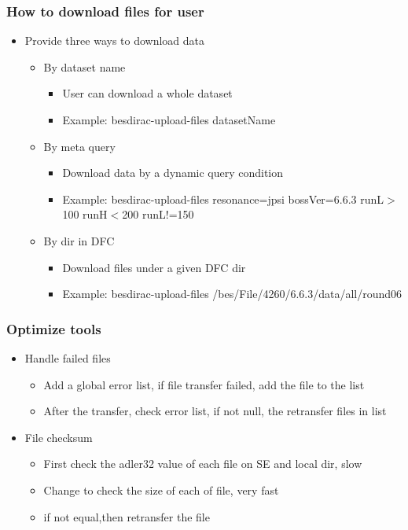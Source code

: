 \documentclass{beamer}
\begin{document}
\begin{frame}
  \frametitle{How to download files for user}
  \begin{itemize}
    \item Provide three ways to download data 
      \begin{itemize}
          \item By dataset name
            \begin{itemize}
                \item User can download a whole dataset
                \item Example: besdirac-upload-files datasetName
            \end{itemize}
          \item By meta query 
            \begin{itemize}
                \item Download data by a dynamic query condition
                \item Example: besdirac-upload-files resonance=jpsi bossVer=6.6.3 runL$>$100 runH$<$200 runL!=150
            \end{itemize}
          \item By dir in DFC
            \begin{itemize}
                \item Download files under a given DFC dir
                \item Example: besdirac-upload-files /bes/File/4260/6.6.3/data/all/round06 
            \end{itemize}
      \end{itemize}
  \end{itemize}
\end{frame}

\begin{frame}
  \frametitle{Optimize tools}
  \begin{itemize}
    \item Handle failed files 
      \begin{itemize}
          \item Add a global error list, if file transfer failed, add the file to the list
          \item After the transfer, check error list, if not null, the retransfer files in list 
      \end{itemize}
    \item File checksum 
      \begin{itemize}
          \item First check the adler32 value of each file on SE and local dir, slow
          \item Change to check the size of each of file, very fast
          \item if not equal,then retransfer the file
      \end{itemize}
  \end{itemize}
\end{frame}
\end{document}
